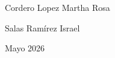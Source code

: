 \begin{titlepage}
\begin{center}
\vspace{0.5cm}
\noindent
\begin{minipage}[t]{0.48\textwidth}
  \centering
  \vspace{0pt}
  Cordero Lopez Martha Rosa 
\end{minipage}%
\hfill
\begin{minipage}[t]{0.48\textwidth}
  \centering
  \vspace{0pt}
  Salas Ramírez Israel
\end{minipage}

\end{center}

\vspace*{\fill}
\begin{flushright}
Mayo 2026
\end{flushright}

\restoregeometry
\end{titlepage}